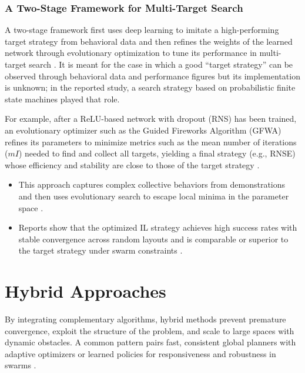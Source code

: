 \subsubsection{A Two-Stage Framework for Multi-Target Search}

A two-stage framework first uses deep learning to imitate a high-performing
target strategy from behavioral data and then refines the weights of the learned
network through evolutionary optimization to tune its performance in multi-target
search \cite{li2019twostage}. It is meant for the case in which a good ``target
strategy'' can be observed through behavioral data and performance figures but
its implementation is unknown; in the reported study, a search strategy based on
probabilistic finite state machines played that role.

For example, after a ReLU-based network with dropout (RNS) has been trained, an
evolutionary optimizer such as the Guided Fireworks Algorithm (GFWA) refines its
parameters to minimize metrics such as the mean number of iterations ($mI$)
needed to find and collect all targets, yielding a final strategy (e.g., RNSE)
whose efficiency and stability are close to those of the target strategy
\cite{li2019twostage}.
\begin{itemize}
  \item {} This approach captures complex collective behaviors
        from demonstrations and then uses evolutionary search to escape local
        minima in the parameter space \cite{li2019twostage}.
  \item {} Reports show that the optimized IL strategy achieves high
        success rates with stable convergence across random layouts and is
        comparable or superior to the target strategy under swarm constraints
        \cite{li2019twostage}.
\end{itemize}

\section{Hybrid Approaches}\label{sec:hybrid}

By integrating complementary algorithms, hybrid methods prevent premature
convergence, exploit the structure of the problem, and scale to large spaces with
dynamic obstacles. A common pattern pairs fast, consistent global planners with
adaptive optimizers or learned policies for responsiveness and robustness in
swarms \cite{lin2022review}.


